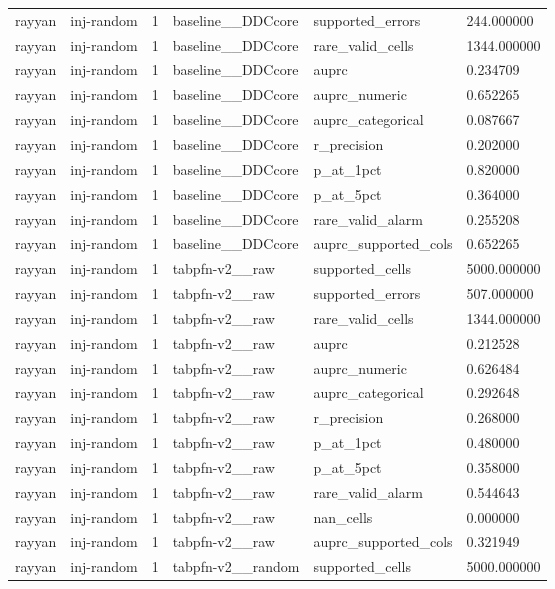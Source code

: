 \begin{tabular}{llllll}
rayyan & inj-random & 1 & baseline\_\_DDCcore & supported\_errors & 244.000000 \\
rayyan & inj-random & 1 & baseline\_\_DDCcore & rare\_valid\_cells & 1344.000000 \\
rayyan & inj-random & 1 & baseline\_\_DDCcore & auprc & 0.234709 \\
rayyan & inj-random & 1 & baseline\_\_DDCcore & auprc\_numeric & 0.652265 \\
rayyan & inj-random & 1 & baseline\_\_DDCcore & auprc\_categorical & 0.087667 \\
rayyan & inj-random & 1 & baseline\_\_DDCcore & r\_precision & 0.202000 \\
rayyan & inj-random & 1 & baseline\_\_DDCcore & p\_at\_1pct & 0.820000 \\
rayyan & inj-random & 1 & baseline\_\_DDCcore & p\_at\_5pct & 0.364000 \\
rayyan & inj-random & 1 & baseline\_\_DDCcore & rare\_valid\_alarm & 0.255208 \\
rayyan & inj-random & 1 & baseline\_\_DDCcore & auprc\_supported\_cols & 0.652265 \\
rayyan & inj-random & 1 & tabpfn-v2\_\_raw & supported\_cells & 5000.000000 \\
rayyan & inj-random & 1 & tabpfn-v2\_\_raw & supported\_errors & 507.000000 \\
rayyan & inj-random & 1 & tabpfn-v2\_\_raw & rare\_valid\_cells & 1344.000000 \\
rayyan & inj-random & 1 & tabpfn-v2\_\_raw & auprc & 0.212528 \\
rayyan & inj-random & 1 & tabpfn-v2\_\_raw & auprc\_numeric & 0.626484 \\
rayyan & inj-random & 1 & tabpfn-v2\_\_raw & auprc\_categorical & 0.292648 \\
rayyan & inj-random & 1 & tabpfn-v2\_\_raw & r\_precision & 0.268000 \\
rayyan & inj-random & 1 & tabpfn-v2\_\_raw & p\_at\_1pct & 0.480000 \\
rayyan & inj-random & 1 & tabpfn-v2\_\_raw & p\_at\_5pct & 0.358000 \\
rayyan & inj-random & 1 & tabpfn-v2\_\_raw & rare\_valid\_alarm & 0.544643 \\
rayyan & inj-random & 1 & tabpfn-v2\_\_raw & nan\_cells & 0.000000 \\
rayyan & inj-random & 1 & tabpfn-v2\_\_raw & auprc\_supported\_cols & 0.321949 \\
rayyan & inj-random & 1 & tabpfn-v2\_\_random & supported\_cells & 5000.000000 \\

\end{tabular}
